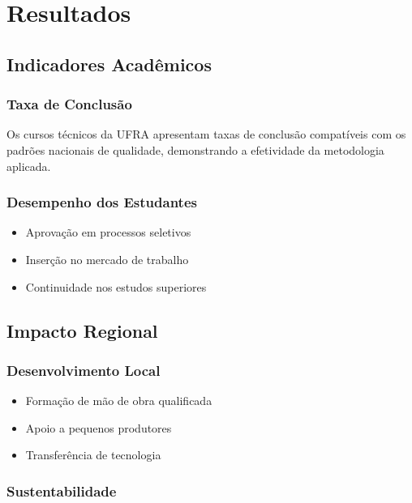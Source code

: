 \documentclass[
  12pt,
  letterpaper,
]{report}
\providecommand{\tightlist}{%
  \setlength{\itemsep}{0pt}\setlength{\parskip}{0pt}}\usepackage{longtable,booktabs,array}
\begin{document}
\chapter{Resultados}\label{resultados}

\section{Indicadores Acadêmicos}\label{indicadores-acaduxeamicos}

\subsection{Taxa de Conclusão}\label{taxa-de-conclusuxe3o}

Os cursos técnicos da UFRA apresentam taxas de conclusão compatíveis com
os padrões nacionais de qualidade, demonstrando a efetividade da
metodologia aplicada.

\subsection{Desempenho dos Estudantes}\label{desempenho-dos-estudantes}

\begin{itemize}
\tightlist
\item
  Aprovação em processos seletivos
\item
  Inserção no mercado de trabalho
\item
  Continuidade nos estudos superiores
\end{itemize}

\section{Impacto Regional}\label{impacto-regional}

\subsection{Desenvolvimento Local}\label{desenvolvimento-local}

\begin{itemize}
\tightlist
\item
  Formação de mão de obra qualificada
\item
  Apoio a pequenos produtores
\item
  Transferência de tecnologia
\end{itemize}

\subsection{Sustentabilidade}\label{sustentabilidade}
\end{document}

